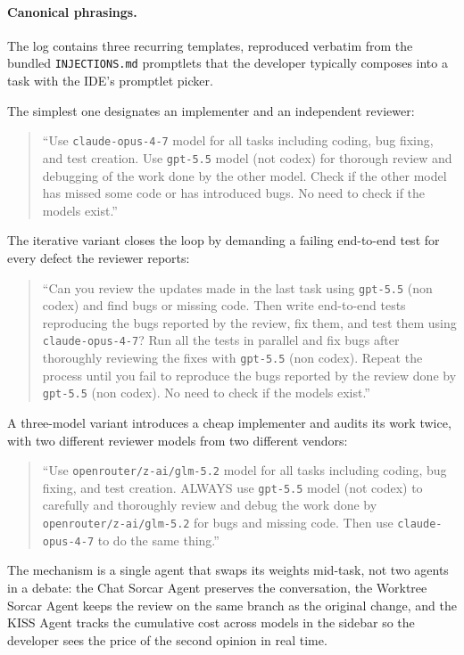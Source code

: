 \documentclass{article}
\begin{document}
\paragraph{Canonical phrasings.}
The log contains three recurring templates, reproduced verbatim from
the bundled \texttt{INJECTIONS.md} promptlets that the developer
typically composes into a task with the IDE's promptlet picker.

The simplest one designates an implementer and an independent
reviewer:
\begin{quote}\small
``Use \texttt{claude-opus-4-7} model for all tasks including
coding, bug fixing, and test creation.  Use \texttt{gpt-5.5} model
(not codex) for thorough review and debugging of the work done by
the other model.  Check if the other model has missed some code or
has introduced bugs.  No need to check if the models exist.''
\end{quote}

The iterative variant closes the loop by demanding a failing
end-to-end test for every defect the reviewer reports:
\begin{quote}\small
``Can you review the updates made in the last task using
\texttt{gpt-5.5} (non codex) and find bugs or missing code.  Then
write end-to-end tests reproducing the bugs reported by the review,
fix them, and test them using \texttt{claude-opus-4-7}?  Run all the
tests in parallel and fix bugs after thoroughly reviewing the fixes
with \texttt{gpt-5.5} (non codex).  Repeat the process until you
fail to reproduce the bugs reported by the review done by
\texttt{gpt-5.5} (non codex).  No need to check if the models
exist.''
\end{quote}

A three-model variant introduces a cheap implementer and audits its
work twice, with two different reviewer models from two different
vendors:
\begin{quote}\small
``Use \texttt{openrouter/z-ai/glm-5.2} model for all tasks including
coding, bug fixing, and test creation.  ALWAYS use \texttt{gpt-5.5}
model (not codex) to carefully and thoroughly review and debug the
work done by \texttt{openrouter/z-ai/glm-5.2} for bugs and missing
code.  Then use \texttt{claude-opus-4-7} to do the same thing.''
\end{quote}

\noindent The mechanism is a single agent that swaps its weights
mid-task, not two agents in a debate: the Chat Sorcar Agent
preserves the conversation, the Worktree Sorcar Agent keeps the
review on the same branch as the original change, and the KISS Agent
tracks the cumulative cost across models in the sidebar so the
developer sees the price of the second opinion in real time.
\end{document}
